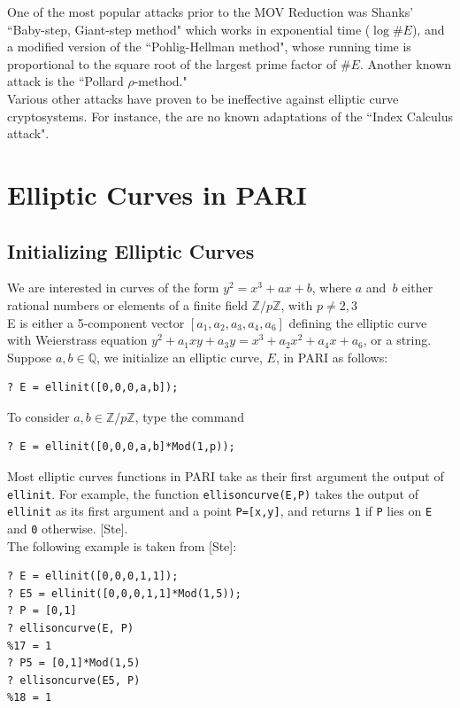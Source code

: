 \documentclass[12pt]{article}
\newcommand{\Z}{\mathbb{Z}}
\newcommand{\Q}{\mathbb{Q}}
\begin{document}
One of the most popular attacks prior to the MOV Reduction was Shanks' ``Baby-step, Giant-step method" which works in exponential time ($\log \#E$), and a modified version of the ``Pohlig-Hellman method", whose running time is proportional to the square root of the largest prime factor of $\#E$. Another known attack is the ``Pollard $\rho$-method." \\

Various other attacks have proven to be ineffective against elliptic curve cryptosystems. For instance, the are no known adaptations of the ``Index Calculus attack".  \\

\section{Elliptic Curves in PARI}

\subsection{Initializing Elliptic Curves}
We are interested in curves of the form $y^2 = x^3 + ax + b$, where $a$ and~$b$ either rational 
numbers or elements of a finite field $\Z/p\Z$, with $p \neq 2,3$\\

E is either a 5-component vector $[a_1,a_2,a_3,a_4,a_6]$ defining the elliptic curve with Weierstrass equation $y^2 + a_1 xy + a_3 y = x^3 + a_2 x^2 + a_4 x + a_6$, or a string. \\

Suppose $a, b \in \Q$, we initialize an elliptic curve, $E$, in PARI as follows:
\begin{verbatim}
? E = ellinit([0,0,0,a,b]);
\end{verbatim}
To consider $a, b \in \Z/p\Z$, type the command 
\begin{verbatim}
? E = ellinit([0,0,0,a,b]*Mod(1,p));
\end{verbatim}

Most elliptic curves functions in PARI take as their first argument
the output of {\tt ellinit}.  For example, the function 
{\tt ellisoncurve(E,P)} takes the output of {\tt ellinit} as its
first argument and a point {\tt P=[x,y]}, and returns {\tt 1} if {\tt P}
lies on {\tt E} and {\tt 0} otherwise. [Ste]. \\

The following example is taken from [Ste]:
\begin{verbatim}
? E = ellinit([0,0,0,1,1]);
? E5 = ellinit([0,0,0,1,1]*Mod(1,5));
? P = [0,1]
? ellisoncurve(E, P)
%17 = 1
? P5 = [0,1]*Mod(1,5) 
? ellisoncurve(E5, P)
%18 = 1
\end{verbatim}
\end{document}
